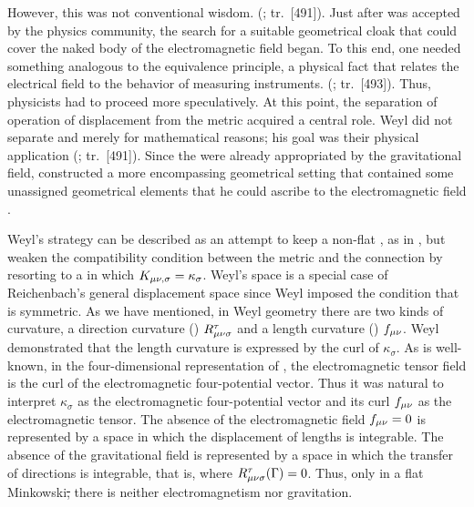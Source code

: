 \documentclass[final]{article}
\renewcommand{\Mink}{Minkowski\xspace}
\newcommand{\faradaymn}{\ensuremath{f\mn}}
\newcommand{\faraday}{\ensuremath{f}}
\renewcommand{\rzlap}[2]{(\cite[#1]{Reichenbach1928}; tr.\ [#2])\xspace}
\begin{document}
However, this was not conventional wisdom.  \rzlap{352}{491}. Just after \gr was accepted by the physics community, the search for a suitable geometrical cloak that could cover the naked body of the electromagnetic field began. To this end, one needed something analogous to the equivalence principle, a physical fact that relates the electrical field to the behavior of measuring instruments.  \rzlap{354}{493}. Thus, physicists had to proceed more speculatively. At this point, the separation of operation of displacement from the metric acquired a central role. Weyl did not separate \Gtmn and \gmn merely for mathematical reasons; his goal was their physical application \rzlap{354}{491}. Since the \gmn were already appropriated by the gravitational field, \citet{Weyl1918a} constructed a more encompassing geometrical setting that contained some unassigned geometrical elements that he could ascribe to the electromagnetic field .

Weyl's strategy can be described as an attempt to keep a non-flat \spti, as in \gr, but weaken the compatibility condition between the metric \gmn and the connection \Gtnm by resorting to a  in which $K_{\mu \nu, \sigma} =\kappa_\sigma$. Weyl's space is a special case of Reichenbach's general displacement space since Weyl imposed the condition that \Gtmn is symmetric. As we have mentioned, in Weyl geometry there are two kinds of curvature, a direction curvature () $R_{\mu \nu \sigma}^{\tau}$ and a length curvature () $\faraday\mn$. Weyl demonstrated that the length curvature is expressed by the curl of $\kappa_\sigma$. As is well-known, in the four-dimensional representation of \Maxwell \ed, the electromagnetic tensor field is the curl of the electromagnetic four-potential vector\label{vacuum}. Thus it was natural to interpret $\kappa_\sigma$ as the electromagnetic four-potential vector and its curl $f_{\mu\nu}$ as the electromagnetic tensor. The absence of the electromagnetic field $\faradaymn = 0$ is represented by a space in which the displacement of lengths is integrable. The absence of the gravitational field is represented by a space in which the transfer of directions is integrable, that is, where $R_{\mu \nu \sigma}^{\tau}(\Gamma)= 0$. Thus, only in a flat \Mink \st, there is neither electromagnetism nor gravitation.
\end{document}

